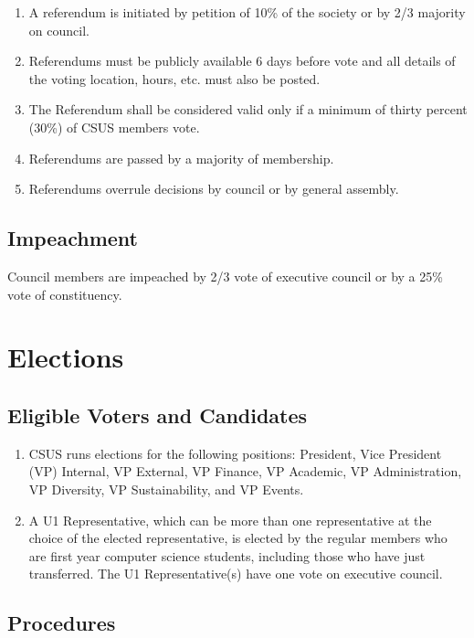 \begin{enumerate}
\def\labelenumi{\arabic{enumi}.}
\item
  A referendum is initiated by petition of 10\% of the society or by 2/3
  majority on council.
\item
  Referendums must be publicly available 6 days before vote and all
  details of the voting location, hours, etc. must also be posted.
\item
  The Referendum shall be considered valid only if a minimum of thirty
  percent (30\%) of CSUS members vote.
\item
  Referendums are passed by a majority of membership.
\item
  Referendums overrule decisions by council or by general assembly.
\end{enumerate}

\subsection{Impeachment}\label{impeachment}

Council members are impeached by 2/3 vote of executive council or by a
25\% vote of constituency.

\section{Elections}\label{elections}

\subsection{Eligible Voters and
Candidates}\label{eligible-voters-and-candidates}

\begin{enumerate}
\def\labelenumi{\arabic{enumi}.}
\item
  CSUS runs elections for the following positions: President, Vice
  President (VP) Internal, VP External, VP Finance, VP Academic, VP
  Administration, VP Diversity, VP Sustainability, and VP Events.
\item
  A U1 Representative, which can be more than one representative at the
  choice of the elected representative, is elected by the regular
  members who are first year computer science students, including those
  who have just transferred. The U1 Representative(s) have one vote on
  executive council.
\end{enumerate}

\subsection{Procedures}\label{procedures}

